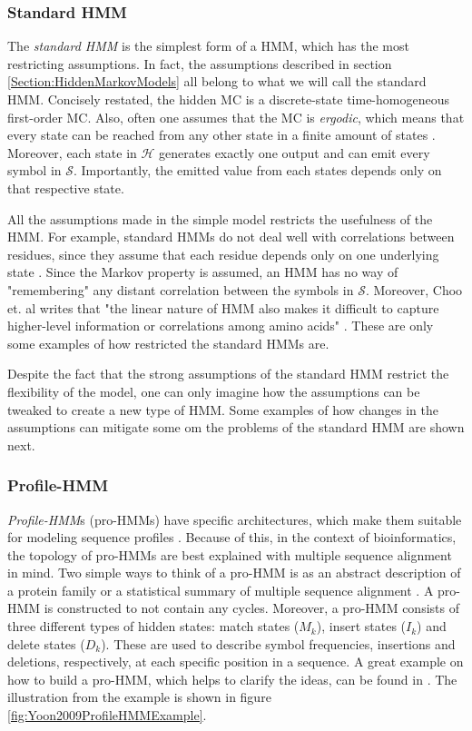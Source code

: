 \documentclass{article}\usepackage[]{graphicx}\usepackage[]{color}
\begin{document}
\subsubsection{Standard HMM}\label{Section:StandardHMM}
The \textit{standard HMM} is the simplest form of a HMM, which has the most restricting assumptions. In fact, the assumptions described in section \ref{Section:HiddenMarkovModels} all belong to what we will call the standard HMM. Concisely restated, the hidden MC is a discrete-state time-homogeneous first-order MC. Also, often one assumes that the MC is \textit{ergodic}, which means that every state can be reached from any other state in a finite amount of states \cite{Rabiner1989}. Moreover, each state in $\mathcal{H}$ generates exactly one output and can emit every symbol in $\mathcal{S}$. Importantly, the emitted value from each states depends only on that respective state. 

All the assumptions made in the simple model restricts the usefulness of the HMM. For example, standard HMMs do not deal well with correlations between residues, since they assume that each residue depends only on one underlying state \cite{Eddy04}. Since the Markov property is assumed, an HMM has no way of "remembering" any distant correlation between the symbols in $\mathcal{S}$. Moreover, Choo et. al writes that "the linear nature of HMM also makes it difficult to capture higher-level information or correlations among amino acids" \cite{Choo2004}. These are only some examples of how restricted the standard HMMs are. 

Despite the fact that the strong assumptions of the standard HMM restrict the flexibility of the model, one can only imagine how the assumptions can be tweaked to create a new type of HMM. Some examples of how changes in the assumptions can mitigate some om the problems of the standard HMM are shown next.  

\subsubsection{Profile-HMM}\label{Section:Profile-HMM}
\textit{Profile-HMM}s (pro-HMMs) have specific architectures, which make them suitable for modeling sequence profiles \cite{Yoon2009}. Because of this, in the context of bioinformatics, the topology of pro-HMMs are best explained with multiple sequence alignment in mind. Two simple ways to think of a pro-HMM is as an abstract description of a protein family or a statistical summary of multiple sequence alignment \cite{Christianini2006}. A pro-HMM is constructed to not contain any cycles. Moreover, a pro-HMM consists of three different types of hidden states: match states ($M_k$), insert states ($I_k$) and delete states ($D_k$). These are used to describe symbol frequencies, insertions and deletions, respectively, at each specific position in a sequence. A great example on how to build a pro-HMM, which helps to clarify the ideas, can be found in \cite{Yoon2009}. The illustration from the example is shown in figure \ref{fig:Yoon2009ProfileHMMExample}.
\end{document}
